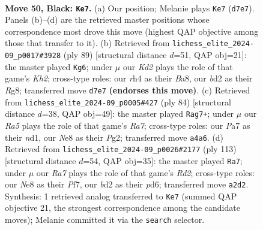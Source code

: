 \documentclass[11pt]{article}
\begin{document}
\clearpage

\begin{figure}[p]\centering
\begin{subfigure}{0.46\textwidth}\centering
\resizebox{\linewidth}{!}{%
\newchessgame
\chessboard[
  setfen={4n3/p1pk4/8/5p2/r4P1R/8/r2B3P/1K3BR1 b - - 5 50},
  showmover=false,
  pgfstyle=straightmove, color=movearrow, markmove={d7-e7}
]}
\caption{}
\end{subfigure}\hfill
\begin{subfigure}{0.46\textwidth}\centering
\resizebox{\linewidth}{!}{%
\newchessgame
\chessboard[
  setfen={b5r1/2R3pk/2P5/1r6/4p1P1/8/1B1R1P1K/8 b - - 0 45},
  showmover=false,
  pgfstyle=straightmove, color=movearrow, markmove={h7-g6}
]}
\caption{}
\end{subfigure}
\\[4pt]
\begin{subfigure}{0.46\textwidth}\centering
\resizebox{\linewidth}{!}{%
\newchessgame
\chessboard[
  setfen={6k1/R6R/5r1p/4N3/8/p3P1KP/6P1/r2n4 w - - 3 43},
  showmover=false,
  pgfstyle=straightmove, color=movearrow, markmove={a7-g7}
]}
\caption{}
\end{subfigure}\hfill
\begin{subfigure}{0.46\textwidth}\centering
\resizebox{\linewidth}{!}{%
\newchessgame
\chessboard[
  setfen={8/3r1pk1/2KP1n2/6pp/8/3R2P1/4R3/8 b - - 9 57},
  showmover=false,
  pgfstyle=straightmove, color=movearrow, markmove={d7-a7}
]}
\caption{}
\end{subfigure}
\caption{\textbf{Move 50, Black: \texttt{Ke7}.} (a) Our position; Melanie plays \texttt{Ke7} (\texttt{d7e7}). Panels (b)--(d) are the retrieved master positions whose correspondence most drove this move (highest QAP objective among those that transfer to it). (b) Retrieved from \texttt{lichess\_elite\_2024-09\_p0017\#3928} (ply 89) [structural distance $d$=51, QAP obj=21]: the master played \texttt{Kg6}; under $\mu$ our \emph{Kd2} plays the role of that game's \emph{Kh2}; cross-type roles: our \emph{r}h4 as their \emph{B}a8, our \emph{b}d2 as their \emph{R}g8; transferred move \texttt{d7e7} \textbf{(endorses this move)}. (c) Retrieved from \texttt{lichess\_elite\_2024-09\_p0005\#427} (ply 84) [structural distance $d$=38, QAP obj=49]: the master played \texttt{Rag7+}; under $\mu$ our \emph{Ra5} plays the role of that game's \emph{Ra7}; cross-type roles: our \emph{P}a7 as their \emph{n}d1, our \emph{N}e8 as their \emph{P}g2; transferred move \texttt{a4a6}. (d) Retrieved from \texttt{lichess\_elite\_2024-09\_p0026\#2177} (ply 113) [structural distance $d$=54, QAP obj=35]: the master played \texttt{Ra7}; under $\mu$ our \emph{Ra7} plays the role of that game's \emph{Rd2}; cross-type roles: our \emph{N}e8 as their \emph{P}f7, our \emph{b}d2 as their \emph{p}d6; transferred move \texttt{a2d2}. Synthesis: 1 retrieved analog transferred to \texttt{Ke7} (summed QAP objective 21, the strongest correspondence among the candidate moves); Melanie committed it via the \texttt{search} selector.}
\label{fig:thought-m99}
\end{figure}
\end{document}
